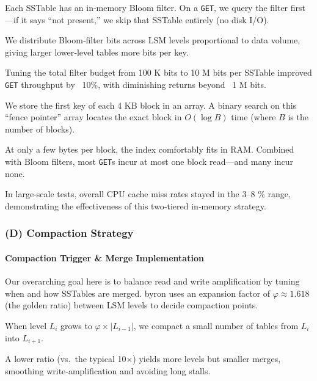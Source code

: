 \documentclass[10pt]{article}
\begin{document}
\begin{description}[leftmargin=1em,labelwidth=*,itemsep=0.5ex]
  \item[Per‐SSTable Filters] Each SSTable has an in‐memory Bloom filter. On a \texttt{GET}, we query the filter first—if it says “not present,” we skip that SSTable entirely (no disk I/O).
  \item[Monkey‐Inspired Allocation] We distribute Bloom‐filter bits across LSM levels proportional to data volume, giving larger lower‐level tables more bits per key.  
  \item[Performance Impact] Tuning the total filter budget from 100 K bits to 10 M bits per SSTable improved \texttt{GET} throughput by ~10\%, with diminishing returns beyond ~1 M bits.  
  \item[Sparse In‐Memory Index] We store the first key of each 4 KB block in an array. A binary search on this “fence pointer” array locates the exact block in $O(\log B)$ time (where $B$ is the number of blocks).
  \item[Compact \& Fast] At only a few bytes per block, the index comfortably fits in RAM. Combined with Bloom filters, most \texttt{GET}s incur at most one block read—and many incur none.\@
  \item[Cache Efficiency] In large‐scale tests, overall CPU cache miss rates stayed in the 3–8 \% range, demonstrating the effectiveness of this two‐tiered in‐memory strategy.
\end{description}


\subsubsection*{(D) Compaction Strategy}

\paragraph{Compaction Trigger \& Merge Implementation}
Our overarching goal here is to balance read and write amplification by tuning when and how SSTables are merged. byron uses an expansion factor of $\varphi\approx1.618$ (the golden ratio) between LSM levels to decide compaction points.

\begin{description}[leftmargin=1em,labelwidth=*,itemsep=0.5ex]
  \item[Size Ratio] When level $L_{i}$ grows to $\varphi \times |L_{i-1}|$, we compact a small number of tables from $L_{i}$ into $L_{i+1}$.  
  \item[Frequent, Small Jobs] A lower ratio (vs.\ the typical 10×) yields more levels but smaller merges, smoothing write‐amplification and avoiding long stalls.
\end{description}
\end{document}
